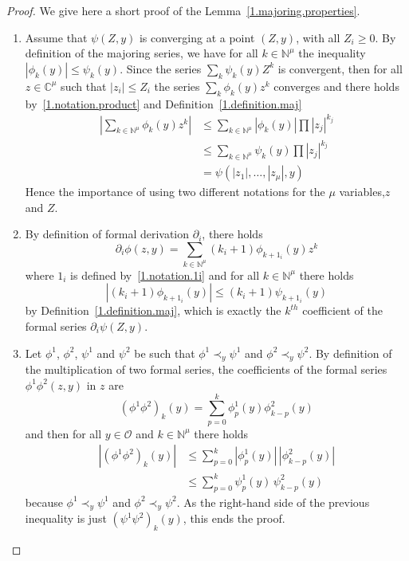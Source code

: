 \documentclass[10pt]{amsart}
\theoremstyle{definition}
\theoremstyle{plain}
\newcommand*\Cbb{{\mathbb C}}%
\newcommand*\N{{\mathbb N}}
\newcommand{\dptl}{\partial}%
\begin{document}
\begin{proof}
We give here a short proof of the Lemma~\ref{1.majoring.properties}.
\begin{enumerate}

\item Assume that $\psi(Z,y)$ is converging at a point $(Z,y)$, with all $Z_i \geq 0$. By definition of the majoring series, we have for all $k\in\N^{\mu}$ the inequality $ |\phi_{k}(y)| \leq \psi_{k}(y) $. Since the series $\sum_{k} \psi_{k}(y)Z^{k}$ is convergent, then for all $z\in\Cbb^{\mu}$ such that $|z_i| \leq Z_i$ the series $\sum_{k} \phi_{k}(y) z^{k}$ converges and there holds by~\eqref{1.notation.product} and Definition~\ref{1.definition.maj}
\begin{align*}
\left| \sum_{k\in\N^{\mu}} \phi_{k}(y) z^{k} \right| & \leq \sum_{k\in\N^{\mu}} |\phi_{k}(y)| \prod |z_j|^{k_j} \\
& \leq \sum_{k\in\N^{\mu}} \psi_{k}(y) \prod |z_j|^{k_j} \\
& = \psi(|z_1|,\ldots,|z_{\mu}|,y)
\end{align*}
Hence the importance of using two different notations for the $\mu$ variables,\linebreak$z$ and $Z$.

\item By definition of formal derivation $\dptl_{i}$, there holds
\[
\dptl_{i}\phi(z,y) = \sum_{k\in\N^{\mu}} (k_i+1) \phi_{k+1_{i}}(y) z^{k}
\]
where $1_{i}$ is defined by~\eqref{1.notation.1i} and for all $k\in\N^{\mu}$ there holds
\[
|(k_i+1) \phi_{k+1_{i}}(y)| \leq (k_i+1) \psi_{k+1_{i}}(y)
\]
by Definition~\ref{1.definition.maj}, which is exactly the $k^{th}$ coefficient of the formal series $\dptl_{i}\psi(Z,y)$.

\item Let $\phi^1$, $\phi^2$, $\psi^1$ and $\psi^2$ be such that $ \phi^1 \prec_{y} \psi^1$ and $ \phi^2 \prec_{y} \psi^2 $. By definition of the multiplication of two formal series, the coefficients of the formal series $\phi^1\phi^2(z,y)$ in $z$ are
\[
(\phi^1\phi^2)_{k}(y) = \sum_{p=0}^{k} \phi^1_{p}(y)\phi^2_{k-p}(y)
\]
and then for all $y\in\mathcal{O}$ and $k\in\N^{\mu}$ there holds
\begin{align*}
\left|(\phi^1\phi^2)_{k}(y)\right| & \leq \sum_{p=0}^{k} \left|\phi^1_{p}(y)\right| \,\left|\phi^2_{k-p}(y)\right| \\
& \leq \sum_{p=0}^{k} \psi^1_{p}(y) \,\psi^2_{k-p}(y)
\end{align*}
because $\phi^{1} \prec_{y} \psi^{1}$ and $\phi^2 \prec_y \psi^2$. As the right-hand side of the previous inequality is just $(\psi^1\psi^2)_k(y)$, this ends the proof.


\end{enumerate}
\end{proof}
\end{document}
